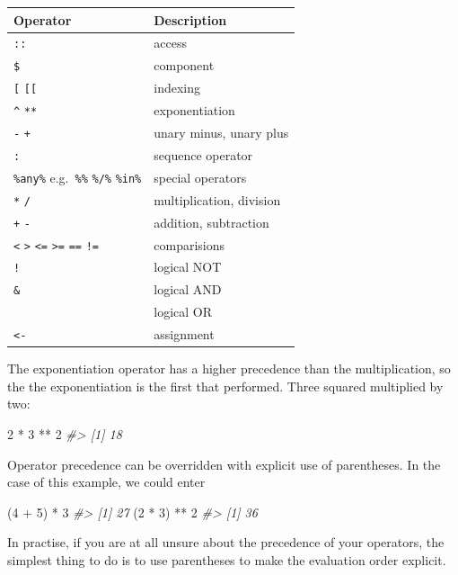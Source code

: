 \documentclass[
]{book}
\newenvironment{Shaded}{\begin{snugshade}}{\end{snugshade}}
\newcommand{\CommentTok}[1]{\textcolor[rgb]{0.56,0.35,0.01}{\textit{#1}}}
\newcommand{\DecValTok}[1]{\textcolor[rgb]{0.00,0.00,0.81}{#1}}
\newcommand{\NormalTok}[1]{#1}
\newcommand{\SpecialCharTok}[1]{\textcolor[rgb]{0.00,0.00,0.00}{#1}}
\begin{document}
\begin{longtable}[]{@{}ll@{}}
\toprule
Operator & Description\tabularnewline
\midrule
\endhead
\texttt{::} & access\tabularnewline
\texttt{\$} & component\tabularnewline
\texttt{{[}} \texttt{{[}{[}} & indexing\tabularnewline
\texttt{\^{}} \texttt{**} & exponentiation\tabularnewline
\texttt{-} \texttt{+} & unary minus, unary plus\tabularnewline
\texttt{:} & sequence operator\tabularnewline
\texttt{\%any\%} e.g.~\texttt{\%\%} \texttt{\%/\%} \texttt{\%in\%} & special operators\tabularnewline
\texttt{*} \texttt{/} & multiplication, division\tabularnewline
\texttt{+} \texttt{-} & addition, subtraction\tabularnewline
\texttt{\textless{}} \texttt{\textgreater{}} \texttt{\textless{}=} \texttt{\textgreater{}=} \texttt{==} \texttt{!=} & comparisions\tabularnewline
\texttt{!} & logical NOT\tabularnewline
\texttt{\&} & logical AND\tabularnewline
\texttt{\textbar{}} & logical OR\tabularnewline
\texttt{\textless{}-} & assignment\tabularnewline
\bottomrule
\end{longtable}

The exponentiation operator has a higher precedence than the multiplication, so the the exponentiation is the first that performed. Three squared multiplied by two:

\begin{Shaded}
\begin{Highlighting}[]
\DecValTok{2} \SpecialCharTok{*} \DecValTok{3} \SpecialCharTok{**} \DecValTok{2}
\CommentTok{\#\textgreater{} [1] 18}
\end{Highlighting}
\end{Shaded}

Operator precedence can be overridden with explicit use of parentheses. In the case of this example, we could enter

\begin{Shaded}
\begin{Highlighting}[]
\NormalTok{(}\DecValTok{4} \SpecialCharTok{+} \DecValTok{5}\NormalTok{) }\SpecialCharTok{*} \DecValTok{3} 
\CommentTok{\#\textgreater{} [1] 27}
\NormalTok{(}\DecValTok{2} \SpecialCharTok{*} \DecValTok{3}\NormalTok{) }\SpecialCharTok{**} \DecValTok{2}
\CommentTok{\#\textgreater{} [1] 36}
\end{Highlighting}
\end{Shaded}

In practise, if you are at all unsure about the precedence of your operators, the simplest thing to do is to use parentheses to make the evaluation order explicit.
\end{document}
